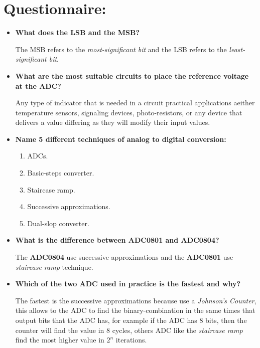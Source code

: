 \section{Questionnaire:}

\begin{itemize} 
\item {\bfseries What does the LSB and the MSB?} \hfill \break

The MSB refers to the {\itshape most-significant bit} and the LSB refers to the {\itshape least-significant bit}. \hfill \break

\item {\bfseries What are the most suitable circuits to place the reference voltage at the ADC?} \hfill \break

Any type of indicator that is needed in a circuit practical applications aeither temperature sensors, signaling devices, photo-resistors, or any device that delivers a value differing as they will modify their input values. \hfill \break

\item {\bfseries Name 5 different techniques of analog to digital conversion:} \hfill \break

\begin{enumerate}
\item ADCs.
\item Basic-steps converter.
\item Staircase ramp.
\item Successive approximations.
\item Dual-slop converter.
\end{enumerate} \hfill

\item {\bfseries What is the difference between ADC0801 and ADC0804?} \hfill \break

The {\bfseries ADC0804} use successive approximations and the {\bfseries ADC0801} use {\itshape staircase ramp} technique. \hfill \break

\item {\bfseries Which of the two ADC used in practice is the fastest and why?} \hfill \break

The fastest is the successive approximations because use a {\itshape Johnson's Counter}, this allows to the ADC to find the binary-combination in the same times that output bits that the ADC has, for example if the ADC has 8 bits, then the counter will find the value in 8 cycles, others ADC like the {\itshape staircase ramp} find the most higher value in $2^{n}$ iterations.
\end{itemize}

\pagebreak